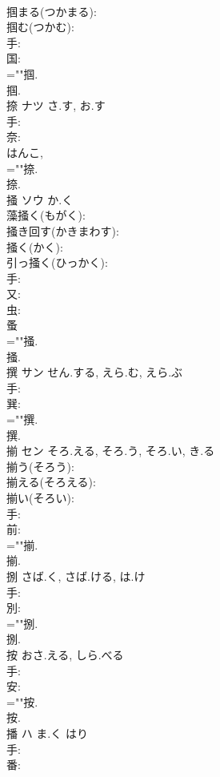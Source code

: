 \documentclass[8pt]{extreport}
\begin{document}
\begin{CJK}{UTF8}{min}
\\	掴まる(つかまる): 
\\	掴む(つかむ): 
\\	手: 
\\	国: 
\\	=""掴.
\\	掴.
\\	捺	ナツ	さ.す, お.す		
\\	手: 
\\	奈: 
\\	はんこ, 
\\	=""捺.
\\	捺.
\\	掻	ソウ	か.く		
\\	藻掻く(もがく): 
\\	掻き回す(かきまわす): 
\\	掻く(かく): 
\\	引っ掻く(ひっかく): 
\\	手: 
\\	又: 
\\	虫: 
\\	蚤 
\\	=""掻.
\\	掻.
\\	撰	サン	せん.する, えら.む, えら.ぶ		
\\	手: 
\\	巽: 
\\	=""撰.
\\	撰.
\\	揃	セン	そろ.える, そろ.う, そろ.い, き.る		
\\	揃う(そろう): 
\\	揃える(そろえる): 
\\	揃い(そろい): 
\\	手: 
\\	前: 
\\	=""揃.
\\	揃.
\\	捌		さば.く, さば.ける, は.け				
\\	手: 
\\	別: 
\\	=""捌.
\\	捌.
\\	按		おさ.える, しら.べる				
\\	手: 
\\	安: 
\\	=""按.
\\	按.
\\	播	ハ	ま.く	はり	
\\	手: 
\\	番: 

\end{CJK}
\end{document}
